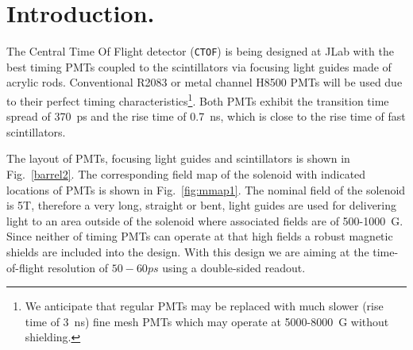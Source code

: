 \documentclass[12pt]{article}
\begin{document}
{\section{Introduction.}
The Central Time Of Flight detector ({\tt CTOF}) is being designed at JLab with 
the  best timing PMTs coupled
to the scintillators via  focusing  light guides made of acrylic rods.
Conventional 
R2083 or metal channel H8500 PMTs will be used due to their perfect timing 
characteristics\footnote{We anticipate that regular PMTs
may be replaced with much slower (rise time of 3~ns) fine mesh PMTs 
which may operate at 5000-8000~G without shielding.}. 
Both PMTs  exhibit the  transition time spread of 370~ps and  the   
rise time of 0.7~ns, which is close to the rise time of fast scintillators.  
}
The layout of PMTs,  focusing light guides and scintillators  is shown 
in Fig.~{\ref{barrel2}}. The  corresponding field map of the  solenoid with 
indicated  locations of PMTs is shown in  Fig.~\ref{fig:mmap1}.
%
The nominal field of the solenoid  is 5T, therefore 
a very long, straight  or bent, light guides  are used  for  
delivering light to an area outside of the  solenoid where 
associated fields are of 500-1000~G. 
Since neither of timing PMTs can operate 
at that high fields a  robust magnetic shields are included into the design. 
With this design  we are aiming at the time-of-flight resolution of 
$50-60ps$ using  a double-sided readout.   
\end{document}
